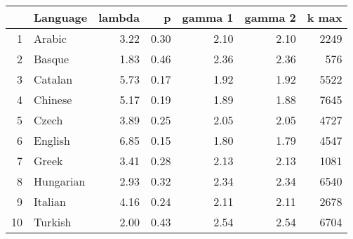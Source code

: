 \begin{table}[ht]
\centering
\begin{tabular}{rlrrrrr}
  \hline
 & Language & lambda & p & gamma 1 & gamma 2 & k max \\ 
  \hline
1 & Arabic & 3.22 & 0.30 & 2.10 & 2.10 & 2249 \\ 
  2 & Basque & 1.83 & 0.46 & 2.36 & 2.36 & 576 \\ 
  3 & Catalan & 5.73 & 0.17 & 1.92 & 1.92 & 5522 \\ 
  4 & Chinese & 5.17 & 0.19 & 1.89 & 1.88 & 7645 \\ 
  5 & Czech & 3.89 & 0.25 & 2.05 & 2.05 & 4727 \\ 
  6 & English & 6.85 & 0.15 & 1.80 & 1.79 & 4547 \\ 
  7 & Greek & 3.41 & 0.28 & 2.13 & 2.13 & 1081 \\ 
  8 & Hungarian & 2.93 & 0.32 & 2.34 & 2.34 & 6540 \\ 
  9 & Italian & 4.16 & 0.24 & 2.11 & 2.11 & 2678 \\ 
  10 & Turkish & 2.00 & 0.43 & 2.54 & 2.54 & 6704 \\ 
   \hline
\end{tabular}
\end{table}
